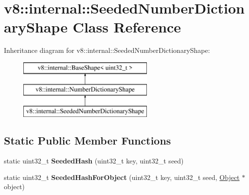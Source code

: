 \hypertarget{classv8_1_1internal_1_1_seeded_number_dictionary_shape}{}\section{v8\+:\+:internal\+:\+:Seeded\+Number\+Dictionary\+Shape Class Reference}
\label{classv8_1_1internal_1_1_seeded_number_dictionary_shape}
Inheritance diagram for v8\+:\+:internal\+:\+:Seeded\+Number\+Dictionary\+Shape\+:\begin{figure}[H]
\begin{center}
\leavevmode
\includegraphics[height=3.000000cm]{classv8_1_1internal_1_1_seeded_number_dictionary_shape}
\end{center}
\end{figure}
\subsection*{Static Public Member Functions}
\begin{DoxyCompactItemize}
\item 
\hypertarget{classv8_1_1internal_1_1_seeded_number_dictionary_shape_ae412ed359bf25f7fd1fd7573262e76c1}{}static uint32\+\_\+t {\bfseries Seeded\+Hash} (uint32\+\_\+t key, uint32\+\_\+t seed)\label{classv8_1_1internal_1_1_seeded_number_dictionary_shape_ae412ed359bf25f7fd1fd7573262e76c1}

\item 
\hypertarget{classv8_1_1internal_1_1_seeded_number_dictionary_shape_aa7de6722f382f2fbb291f25d0d025128}{}static uint32\+\_\+t {\bfseries Seeded\+Hash\+For\+Object} (uint32\+\_\+t key, uint32\+\_\+t seed, \hyperlink{classv8_1_1internal_1_1_object}{Object} $\ast$object)\label{classv8_1_1internal_1_1_seeded_number_dictionary_shape_aa7de6722f382f2fbb291f25d0d025128}

\end{DoxyCompactItemize}
